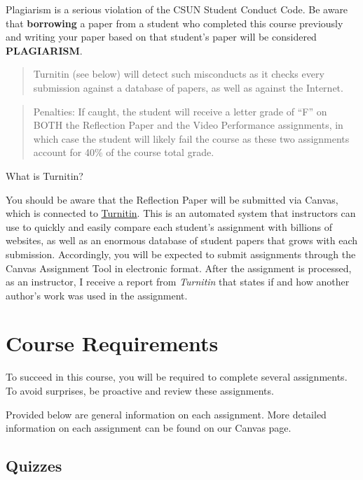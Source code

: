 \documentclass[11pt,]{article}
\begin{document}
Plagiarism is a serious violation of the CSUN Student Conduct Code. Be
aware that \textbf{borrowing} a paper from a student who completed this
course previously and writing your paper based on that student's paper
will be considered \textbf{PLAGIARISM}.

\begin{quote}
Turnitin (see below) will detect such misconducts as it checks every
submission against a database of papers, as well as against the
Internet.
\end{quote}

\begin{quote}
Penalties: If caught, the student will receive a letter grade of ``F''
on BOTH the Reflection Paper and the Video Performance assignments, in
which case the student will likely fail the course as these two
assignments account for 40\% of the course total grade.
\end{quote}

What is Turnitin?

You should be aware that the Reflection Paper will be submitted via
Canvas, which is connected to
\href{https://www.turnitin.com/}{Turnitin}. This is an automated system
that instructors can use to quickly and easily compare each student's
assignment with billions of websites, as well as an enormous database of
student papers that grows with each submission. Accordingly, you will be
expected to submit assignments through the Canvas Assignment Tool in
electronic format. After the assignment is processed, as an instructor,
I receive a report from \emph{Turnitin} that states if and how another
author's work was used in the assignment.

\hypertarget{course-requirements}{%
\section{Course Requirements}\label{course-requirements}}

To succeed in this course, you will be required to complete several
assignments. To avoid surprises, be proactive and review these
assignments.

Provided below are general information on each assignment. More detailed
information on each assignment can be found on our Canvas page.

\hypertarget{quizzes}{%
\subsection{Quizzes}\label{quizzes}}
\end{document}
